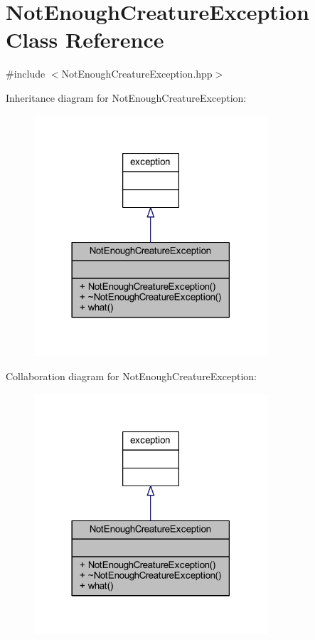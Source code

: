 \hypertarget{class_not_enough_creature_exception}{}\section{Not\+Enough\+Creature\+Exception Class Reference}
\label{class_not_enough_creature_exception}


{\ttfamily \#include $<$Not\+Enough\+Creature\+Exception.\+hpp$>$}



Inheritance diagram for Not\+Enough\+Creature\+Exception\+:\nopagebreak
\begin{figure}[H]
\begin{center}
\leavevmode
\includegraphics[width=246pt]{class_not_enough_creature_exception__inherit__graph}
\end{center}
\end{figure}


Collaboration diagram for Not\+Enough\+Creature\+Exception\+:\nopagebreak
\begin{figure}[H]
\begin{center}
\leavevmode
\includegraphics[width=246pt]{class_not_enough_creature_exception__coll__graph}
\end{center}
\end{figure}
